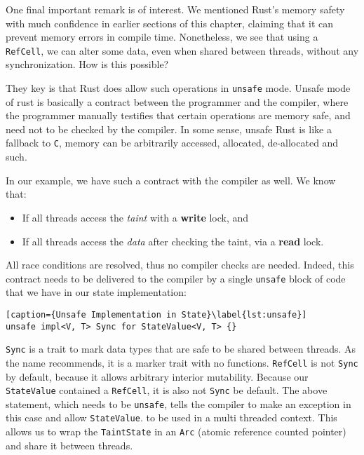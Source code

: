 One final important remark is of interest. We mentioned Rust's memory safety with much confidence in
earlier sections of this chapter, claiming that it can prevent memory errors in compile time.
Nonetheless, we see that using a \texttt{RefCell}, we can alter some data, even when shared between
threads, without any synchronization. How is this possible?

They key is that Rust does allow such operations in \texttt{unsafe} mode. Unsafe mode of rust is
basically a contract between the programmer and the compiler, where the programmer manually
testifies that certain operations are memory safe, and need not to be checked by the compiler. In
some sense, unsafe Rust is like a fallback to \texttt{C}, memory can be arbitrarily accessed,
allocated, de-allocated and such.

In our example, we have such a contract with the compiler as well. We know that:

\begin{itemize}
	\item If all threads access the \textit{taint} with a \textbf{write} lock, and
	\item If all threads access the \textit{data} after checking the taint, via a \textbf{read} lock.
\end{itemize}

All race conditions are resolved, thus no compiler checks are needed. Indeed, this contract needs to
be delivered to the compiler by a single \texttt{unsafe} block of code that we have in our state
implementation:

\begin{lstlisting}[caption={Unsafe Implementation in State}\label{lst:unsafe}]
unsafe impl<V, T> Sync for StateValue<V, T> {}
\end{lstlisting}

\texttt{Sync} is a trait to mark data types that are safe to be shared between threads. As the name
recommends, it is a marker trait with no functions. \texttt{RefCell} is not \texttt{Sync} by
default, because it allows arbitrary interior mutability. Because our \texttt{StateValue} contained
a \texttt{RefCell}, it is also not \texttt{Sync} be default. The above statement, which needs to be
\texttt{unsafe}, tells the compiler to make an exception in this case and allow \texttt{StateValue}.
to be used in a multi threaded context. This allows us to wrap the \texttt{TaintState} in an
\texttt{Arc} (atomic reference counted pointer) and share it between threads.





